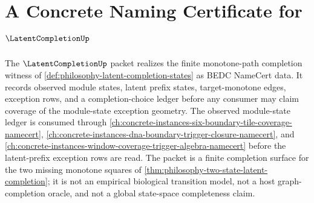 \chapter{A Concrete Naming Certificate for $\LatentCompletionUp$}
\label{ch:concrete-instances-latent-completion-namecert}

The $\LatentCompletionUp$ packet realizes the finite monotone-path completion witness of \autoref{def:philosophy-latent-completion-states} as BEDC NameCert data. It records observed module states, latent prefix states, target-monotone edges, exception rows, and a completion-choice ledger before any consumer may claim coverage of the module-state exception geometry. The observed module-state ledger is consumed through \autoref{ch:concrete-instances-six-boundary-tile-coverage-namecert}, \autoref{ch:concrete-instances-dna-boundary-trigger-closure-namecert}, and \autoref{ch:concrete-instances-window-coverage-trigger-algebra-namecert} before the latent-prefix exception rows are read. The packet is a finite completion surface for the two missing monotone squares of \autoref{thm:philosophy-two-state-latent-completion}; it is not an empirical biological transition model, not a host graph-completion oracle, and not a global state-space completeness claim.

